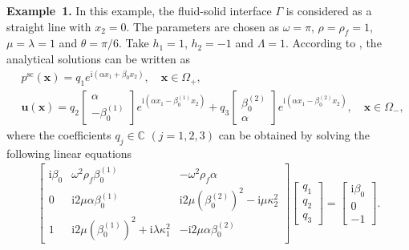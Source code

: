 \documentclass[final,3p,times]{elsarticle}
\begin{document}
\vspace{12pt}
\textbf{Example~1.} In this example, the fluid-solid interface $\Gamma$ is considered as a straight line with $x_2=0$. The parameters are chosen as $\omega=\pi$, $\rho=\rho_f=1$, $\mu=\lambda=1$ and $\theta=\pi / 6$. Take $h_1=1$, $h_2=-1$ and $\Lambda=1$. According to \cite{Hu16}, the analytical solutions can be written as
\begin{align*}
	&p^{\mathrm{sc}}(\boldsymbol{x})  =q_1 e^{\mathrm{i}\left(\alpha x_1+\beta_0 x_2\right)}, \quad \boldsymbol{x} \in \Omega_+, \\
	&\boldsymbol{u}(\boldsymbol{x})  =q_2\left[\begin{array}{c}
		\alpha \\
		-\beta_0^{(1)}
	\end{array}\right] e^{\mathrm{i}\left(\alpha x_1-\beta_0^{(1)} x_2\right)}+q_3\left[\begin{array}{c}
		\beta_0^{(2)} \\
		\alpha
	\end{array}\right] e^{\mathrm{i}\left(\alpha x_1-\beta_0^{(2)} x_2\right)}, \quad \boldsymbol{x} \in \Omega_-,
\end{align*}
where the coefficients $q_j \in \mathbb{C}$ $(j=1,2,3)$ can be obtained by solving the following linear equations
\begin{align*}
	\left[\begin{array}{ccc}
		\mathrm{i} \beta_0 & \omega^2 \rho_f \beta_0^{(1)} & - \omega^2\rho_f \alpha \\
		0 & \mathrm{i} 2  \mu \alpha \beta_0^{(1)} & \mathrm{i}  2 \mu\left(\beta_0^{(2)}\right)^2-\mathrm{i} \mu \kappa_2^2 \\
		1 & \mathrm{i}2 \mu\left(\beta_0^{(1)}\right)^2+\mathrm{i} \lambda \kappa_1^2 & - \mathrm{i} 2 \mu \alpha \beta_0^{(2)}
	\end{array}\right]\left[\begin{array}{l}
		q_1 \\
		q_2 \\
		q_3
	\end{array}\right]=\left[\begin{array}{c}
		\mathrm{i} \beta_0 \\
		0 \\
		-1
	\end{array}\right].
\end{align*}
\end{document}
